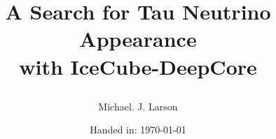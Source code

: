 \documentclass[11pt,a4paper,titlepage,twoside]{scrreprt}
\author{Michael. J. Larson}
\title{\parbox{\textwidth}{A Search for Tau Neutrino Appearance \\ with IceCube-DeepCore}}
\subtitle{}
\date{Handed in: \today}
\begin{document}
\maketitle

\tableofcontents
\cleardoublepage

\listoffigures
\cleardoublepage

\listoftables
\cleardoublepage

\graphicspath{{chapters/introduction/images/}}
\label{chapter:introduction}


\graphicspath{{chapters/oscillations/images/}}
\label{chapter:oscillations}


\graphicspath{{chapters/detector/images/}}
\label{chapter:detector}


\graphicspath{{chapters/simulation/images/}}
\label{chapter:simulation}


\graphicspath{{chapters/vuvuzela/images/}}
\label{chapter:vuvuzela}


\graphicspath{{chapters/muonsim/images/}}
\label{chapter:muonsim}


\graphicspath{{chapters/greco/images/}}
\label{chapter:greco}


\graphicspath{{chapters/analysis/images/}}
\label{chapter:analysis}


%

\printbibliography

\listoftodos[Notes]
\end{document}
